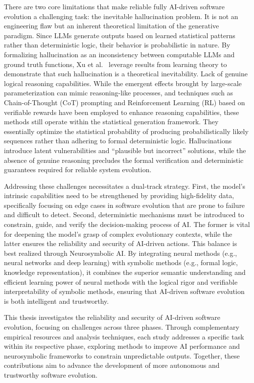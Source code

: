 There are two core limitations that make reliable fully AI-driven software evolution a challenging task:  the inevitable hallucination problem. It is not an engineering flaw but an inherent theoretical limitation of the generative paradigm. Since LLMs generate outputs based on learned statistical patterns rather than deterministic logic, their behavior is probabilistic in nature. By formalizing hallucination as an inconsistency between computable LLMs and ground truth functions, Xu et al.~\cite{xu2024hallucination} leverage results from learning theory to demonstrate that such hallucination is a theoretical inevitability.  Lack of genuine logical reasoning capabilities. While the emergent effects brought by large-scale parameterization can mimic reasoning-like processes, and techniques such as Chain-of-Thought (CoT) prompting and Reinforcement Learning (RL) based on verifiable rewards have been employed to enhance reasoning capabilities, these methods still operate within the statistical generation framework. They essentially optimize the statistical probability of producing probabilistically likely sequences rather than adhering to formal deterministic logic. Hallucinations introduce latent vulnerabilities and ``plausible but incorrect'' solutions, while the absence of genuine reasoning precludes the formal verification and deterministic guarantees required for reliable system evolution. 

Addressing these challenges necessitates a dual-track strategy. First, the model's intrinsic capabilities need to be strengthened by providing high-fidelity data, specifically focusing on edge cases in software evolution that are prone to failure and difficult to detect. Second, deterministic mechanisms must be introduced to constrain, guide, and verify the decision-making process of AI. The former is vital for deepening the model's grasp of complex evolutionary contexts, while the latter ensures the reliability and security of AI-driven actions. This balance is best realized through Neurosymbolic AI. By integrating neural methods (e.g., neural networks and deep learning) with symbolic methods (e.g., formal logic, knowledge representation), it combines the superior semantic understanding and efficient learning power of neural methods with the logical rigor and verifiable interpretability of symbolic methods, ensuring that AI-driven software evolution is both intelligent and trustworthy.

This thesis investigates the reliability and security of AI-driven software evolution, focusing on challenges across three phases. Through complementary empirical resources and analysis techniques, each study addresses a specific task within its respective phase, exploring methods to improve AI performance and neurosymbolic frameworks to constrain unpredictable outputs. Together, these contributions aim to advance the development of more autonomous and trustworthy software evolution.

